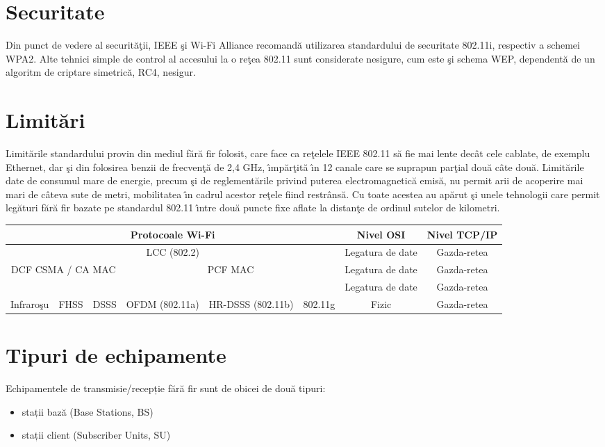\documentclass{article}
\begin{document}
\section{Securitate}
Din punct de vedere al securit\u a\c tii, IEEE \c si Wi-Fi Alliance recomand\u a utilizarea standardului de securitate 802.11i, respectiv a schemei WPA2. Alte tehnici simple de control al accesului la o re\c tea 802.11 sunt considerate nesigure, cum este \c si schema WEP, dependent\u a de un algoritm de criptare simetric\u a, RC4, nesigur.
\section{Limit\u ari}
Limit\u arile standardului provin din mediul f\u ar\u a fir folosit, care face ca re\c telele IEEE 802.11 s\u a fie mai lente dec\^at cele cablate, de exemplu Ethernet, dar \c si din folosirea benzii de frecven\c t\u a de 2,4 GHz, \^{\i}mp\u ar\c tit\u a \^{\i}n 12 canale care se suprapun par\c tial dou\u a c\^ate dou\u a. Limit\u arile date de consumul mare de energie, precum \c si de reglement\u arile privind puterea electromagnetic\u a emis\u a, nu permit arii de acoperire mai mari de c\^ateva sute de metri, mobilitatea \^{\i}n cadrul acestor re\c tele fiind restr\^ans\u a. Cu toate acestea au ap\u arut \c si unele tehnologii care permit leg\u aturi f\u ar\u a fir bazate pe standardul 802.11 \^{\i}ntre dou\u a puncte fixe aflate la distan\c te de ordinul sutelor de kilometri. \par

\begin{center}
\begin{tabular}{|c|c|c|c|c|c|c|c|}
\hline
\multicolumn{6}{|c|}{ Protocoale Wi-Fi} & Nivel OSI & Nivel TCP/IP\\
\hline
\multicolumn{6}{|c|}{ LCC (802.2) } & Legatura de date & Gazda-retea\\
\hline
\multicolumn{3}{|c|}{ DCF CSMA / CA MAC } & \multicolumn{3}{|c|}{ PCF MAC } & Legatura de date & Gazda-retea\\
\hline
\multicolumn{6}{|c|}{  } & Legatura de date & Gazda-retea\\
\hline
Infraro\c su & FHSS & DSSS & OFDM (802.11a) & HR-DSSS (802.11b) & 802.11g & Fizic & Gazda-retea\\
\hline
\end{tabular} 
\end{center}

\section{Tipuri de echipamente}
Echipamentele de transmisie/recepție fără fir sunt de obicei de două tipuri:
\begin{itemize}
\item stații bază (Base Stations, BS)
\item stații client (Subscriber Units, SU)
\end{itemize}
\end{document}
